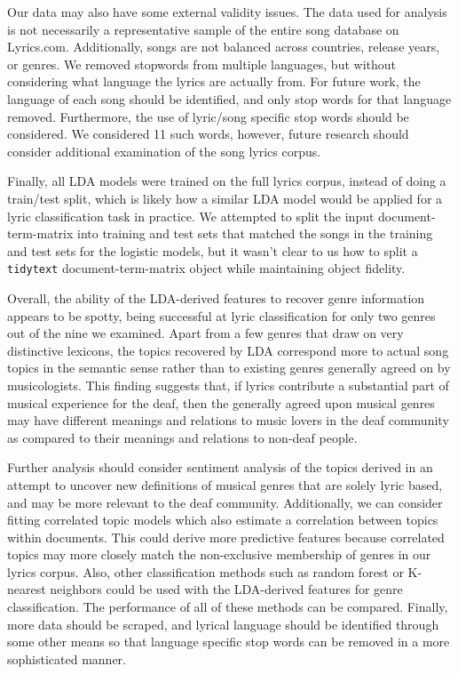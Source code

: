 \documentclass[12pt, titlepage]{article}
\begin{document}
Our data may also have some external validity issues. The data used for analysis is not necessarily a representative sample of the entire song database on Lyrics.com. Additionally, songs are not balanced across countries, release years, or genres. We removed stopwords from multiple languages, but without considering what language the lyrics are actually from. For future work, the language of each song should be identified, and only stop words for that language removed. Furthermore, the use of lyric/song specific stop words should be considered. We considered 11 such words, however, future research should consider additional examination of the song lyrics corpus.

Finally, all LDA models were trained on the full lyrics corpus, instead of doing a train/test split, which is likely how a similar LDA model would be applied for a lyric classification task in practice. We attempted to split the input document-term-matrix into training and test sets that matched the songs in the training and test sets for the logistic models, but it wasn't clear to us how to split a \texttt{tidytext} document-term-matrix object while maintaining object fidelity.

Overall, the ability of the LDA-derived features to recover genre information appears to be spotty, being successful at lyric classification for only two genres out of the nine we examined. Apart from a few genres that draw on very distinctive lexicons, the topics recovered by LDA correspond more to actual song topics in the semantic sense rather than to existing genres generally agreed on by musicologists. This finding suggests that, if lyrics contribute a substantial part of musical experience for the deaf, then the generally agreed upon musical genres may have different meanings and relations to music lovers in the deaf community as compared to their meanings and relations to non-deaf people.

Further analysis should consider sentiment analysis of the topics derived in an attempt to uncover new definitions of musical genres that are solely lyric based, and may be more relevant to the deaf community. Additionally, we can consider fitting correlated topic models which also estimate a correlation between topics within documents. This could derive more predictive features because correlated topics may more closely match the non-exclusive membership of genres in our lyrics corpus. Also, other classification methods such as random forest or K-nearest neighbors could be used with the LDA-derived features for genre classification. The performance of all of these methods can be compared. Finally, more data should be scraped, and lyrical language should be identified through some other means so that language specific stop words can be removed in a more sophisticated manner. 



\end{document}
